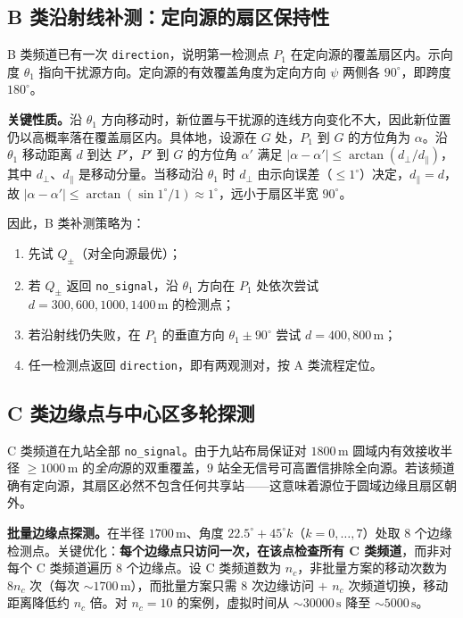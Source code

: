 \documentclass[12pt,a4paper]{ctexart}
\begin{document}
\subsection{B 类沿射线补测：定向源的扇区保持性}
\label{sec:q4-bearing}
B 类频道已有一次 \texttt{direction}，说明第一检测点 $P_1$ 在定向源的覆盖扇区内。示向度 $\theta_1$ 指向干扰源方向。定向源的有效覆盖角度为定向方向 $\psi$ 两侧各 $90^\circ$，即跨度 $180^\circ$。

\textbf{关键性质。}沿 $\theta_1$ 方向移动时，新位置与干扰源的连线方向变化不大，因此新位置仍以高概率落在覆盖扇区内。具体地，设源在 $G$ 处，$P_1$ 到 $G$ 的方位角为 $\alpha$。沿 $\theta_1$ 移动距离 $d$ 到达 $P'$，$P'$ 到 $G$ 的方位角 $\alpha'$ 满足 $|\alpha-\alpha'|\le\arctan(d_{\perp}/d_{\parallel})$，其中 $d_\perp$、$d_\parallel$ 是移动分量。当移动沿 $\theta_1$ 时 $d_\perp$ 由示向误差（$\le1^\circ$）决定，$d_\parallel=d$，故 $|\alpha-\alpha'|\le\arctan(\sin1^\circ/1)\approx1^\circ$，远小于扇区半宽 $90^\circ$。

因此，B 类补测策略为：
\begin{enumerate}
  \item 先试 $Q_\pm$（对全向源最优）；
  \item 若 $Q_\pm$ 返回 \texttt{no\_signal}，沿 $\theta_1$ 方向在 $P_1$ 处依次尝试 $d=300,600,1000,1400\,\mathrm{m}$ 的检测点；
  \item 若沿射线仍失败，在 $P_1$ 的垂直方向 $\theta_1\pm90^\circ$ 尝试 $d=400,800\,\mathrm{m}$；
  \item 任一检测点返回 \texttt{direction}，即有两观测对，按 A 类流程定位。
\end{enumerate}

\subsection{C 类边缘点与中心区多轮探测}
\label{sec:q4-edge}
C 类频道在九站全部 \texttt{no\_signal}。由于九站布局保证对 $1800\,\mathrm{m}$ 圆域内有效接收半径 $\ge1000\,\mathrm{m}$ 的\emph{全向}源的双重覆盖，$9$ 站全无信号可高置信排除全向源。若该频道确有定向源，其扇区必然不包含任何共享站——这意味着源位于圆域边缘且扇区朝外。

\textbf{批量边缘点探测。}在半径 $1700\,\mathrm{m}$、角度 $22.5^\circ+45^\circ k$（$k=0,\ldots,7$）处取 $8$ 个边缘检测点。关键优化：\textbf{每个边缘点只访问一次，在该点检查所有 C 类频道}，而非对每个 C 类频道遍历 $8$ 个边缘点。设 C 类频道数为 $n_c$，非批量方案的移动次数为 $8n_c$ 次（每次 $\sim1700\,\mathrm{m}$），而批量方案只需 $8$ 次边缘访问 $+$ $n_c$ 次频道切换，移动距离降低约 $n_c$ 倍。对 $n_c=10$ 的案例，虚拟时间从 $\sim30000\,\mathrm{s}$ 降至 $\sim5000\,\mathrm{s}$。
\end{document}
